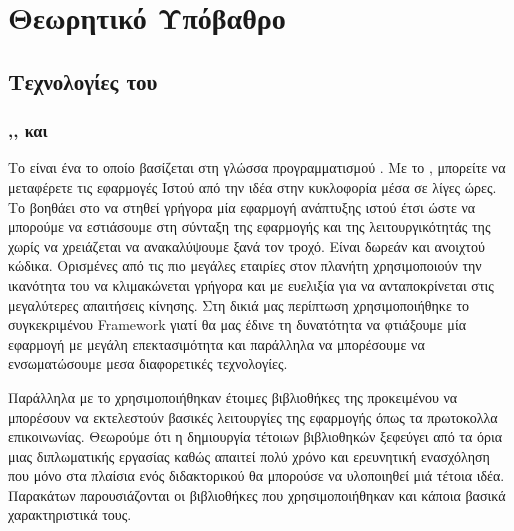 \chapter{Θεωρητικό Υπόβαθρο}

\section{Τεχνολογίες του }

\subsection{,,  και }

Το  είναι ένα  το οποίο βασίζεται στη γλώσσα προγραμματισμού . Με το , μπορείτε να μεταφέρετε τις εφαρμογές Ιστού από την ιδέα στην κυκλοφορία μέσα σε λίγες ώρες. 
Το  βοηθάει στο να στηθεί γρήγορα μία εφαρμογή ανάπτυξης ιστού έτσι ώστε να μπορούμε να εστιάσουμε στη σύνταξη της εφαρμογής και της λειτουργικότητάς της χωρίς να χρειάζεται να ανακαλύψουμε ξανά τον τροχό.
Είναι δωρεάν και ανοιχτού κώδικα. Ορισμένες από τις πιο μεγάλες εταιρίες στον πλανήτη χρησιμοποιούν την ικανότητα του
να κλιμακώνεται γρήγορα και με ευελιξία για να ανταποκρίνεται στις μεγαλύτερες απαιτήσεις κίνησης. Στη δικιά μας περίπτωση χρησιμοποιήθηκε το συγκεκριμένου
{Framework} γιατί θα μας έδινε τη δυνατότητα να φτιάξουμε μία εφαρμογή με μεγάλη επεκτασιμότητα και παράλληλα να μπορέσουμε να ενσωματώσουμε μεσα διαφορετικές τεχνολογίες.

Παράλληλα με το  χρησιμοποιήθηκαν έτοιμες βιβλιοθήκες της  προκειμένου να μπορέσουν να εκτελεστούν βασικές λειτουργίες της εφαρμογής όπως 
τα πρωτοκολλα επικοινωνίας. Θεωρούμε ότι η δημιουργία τέτοιων βιβλιοθηκών ξεφεύγει από τα όρια μιας διπλωματικής εργασίας καθώς απαιτεί πολύ χρόνο και ερευνητική
ενασχόληση που μόνο στα πλαίσια ενός διδακτορικού θα μπορούσε να υλοποιηθεί μιά τέτοια ιδέα. Παρακάτων παρουσιάζονται οι βιβλιοθήκες που χρησιμοποιήθηκαν και κάποια βασικά χαρακτηριστικά τους.

